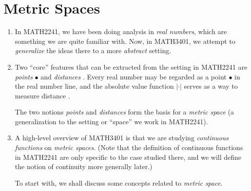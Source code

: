 \section{Metric Spaces}
\label{sect:metric-spaces}
\begin{enumerate}
\item In MATH2241, we have been doing analysis in \emph{real numbers}, which
are something we are quite familiar with. Now, in MATH3401, we attempt to
\emph{generalize} the ideas there to a more \emph{abstract} setting.

\item Two ``core'' features that can be extracted from the setting in MATH2241
are \emph{points} \(\bullet\) and \emph{distances} . Every real
number may be regarded as a point \(\bullet\) in the real number line, and the
absolute value function \(|\cdot|\) serves as a way to measure distance
.

The two notions \emph{points} and \emph{distances} form the basis for a
\emph{metric space} (a generalization to the setting or ``space'' we work in
MATH2241).

\item A high-level overview of MATH3401 is that we are studying
\emph{continuous functions} on \emph{metric spaces}. (Note that the definition
of continuous functions in MATH2241 are only specific to the case studied
there, and we will define the notion of continuity more generally later.)

To start with, we shall discuss some concepts related to \emph{metric space}.
\end{enumerate}
